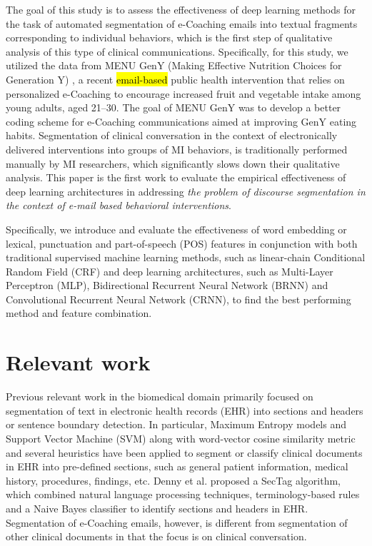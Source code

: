 \documentclass{amia}
\begin{document}
The goal of this study is to assess the effectiveness of deep learning methods for the task of automated segmentation of e-Coaching emails into textual fragments corresponding to individual behaviors, which is the first step of qualitative analysis of this type of clinical communications. Specifically, for this study, we utilized the data from MENU GenY (Making Effective Nutrition Choices for Generation Y) \cite{alexander2017motivations}, a recent \hl{email-based} public health intervention that relies on personalized e-Coaching to encourage increased fruit and vegetable intake among young adults, aged 21--30. The goal of MENU GenY was to develop a better coding scheme for e-Coaching communications aimed at improving GenY eating habits. Segmentation of clinical conversation in the context of electronically delivered interventions into groups of MI behaviors, is traditionally performed manually by MI researchers, which significantly slows down their qualitative analysis. This paper is the first work to evaluate the empirical effectiveness of deep learning architectures in addressing \textit{the problem of discourse segmentation in the context of e-mail based behavioral interventions}. 

Specifically, we introduce and evaluate the effectiveness of word embedding or lexical, punctuation and part-of-speech (POS) features in conjunction with both traditional supervised machine learning methods, such as linear-chain Conditional Random Field (CRF)\cite{lafferty2001conditional} and deep learning architectures, such as Multi-Layer Perceptron (MLP),\cite{rumelhart1986learning} Bidirectional Recurrent Neural Network (BRNN)\cite{schuster1997bidirectional} and Convolutional Recurrent Neural Network (CRNN),\cite{treviso2017sentence} to find the best performing method and feature combination. 

\section*{Relevant work}
Previous relevant work in the biomedical domain primarily focused on segmentation of text in electronic health records (EHR) into sections and headers \cite{apostolova2009automatic,denny2009evaluation,tepper2012statistical,cho2002text} or sentence boundary detection.\cite{griffis2016quantitative,kreuzthaler2015detection,treviso2017sentence} In particular, Maximum Entropy models \cite{tepper2012statistical} and Support Vector Machine (SVM) along with word-vector cosine similarity metric and several heuristics \cite{apostolova2009automatic} have been applied to segment or classify clinical documents in EHR into pre-defined sections, such as general patient information, medical history, procedures, findings, etc. Denny et al. \cite{denny2009evaluation} proposed a SecTag algorithm, which combined natural language processing techniques, terminology-based rules and a Naive Bayes classifier to identify sections and headers in EHR. Segmentation of e-Coaching emails, however, is different from segmentation of other clinical documents in that the focus is on clinical conversation.   
\end{document}
